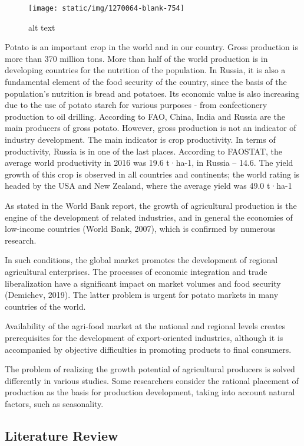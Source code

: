 \documentclass[
  12pt,
]{article}
\begin{document}
\begin{figure}
\centering
\texttt{[image: static/img/1270064-blank-754]}
\caption{alt text}
\end{figure}

Potato is an important crop in the world and in our country. Gross production is more than 370 million tons. More than half of the world production is in developing countries for the
nutrition of the population. In Russia, it is also a fundamental element of the food security of the country, since the basis of the population's nutrition is bread and potatoes. Its economic value is also increasing due to the use of potato starch for various purposes - from confectionery production to
oil drilling.
According to FAO, China, India and Russia are the main producers of gross potato. However, gross production is not an indicator of industry development. The main indicator is crop productivity. In terms of productivity, Russia is in one of the last places. According to FAOSTAT, the average
world productivity in 2016 was 19.6 t·ha-1, in Russia -- 14.6. The yield growth of this crop is observed in all countries and continents; the world rating is headed by the USA and New Zealand, where the average yield was 49.0 t·ha-1

As stated in the World Bank report, the growth of agricultural production is the engine of the development of related industries, and in general the economies of low-income countries (World Bank, 2007), which is confirmed by numerous research.

In such conditions, the global market promotes the development of regional agricultural enterprises. The processes of economic integration and trade liberalization have a significant impact on market volumes and food security (Demichev, 2019). The latter problem is urgent for potato markets in many countries of the world.

Availability of the agri-food market at the national and regional levels creates prerequisites for the development of export-oriented industries, although it is accompanied by objective difficulties in promoting products to final consumers.

The problem of realizing the growth potential of agricultural producers is solved differently in various studies. Some researchers consider the rational placement of production as the basis for production development, taking into account natural factors, such as seasonality.

\hypertarget{literature-review}{%
\subsection{Literature Review}\label{literature-review}}
\end{document}
